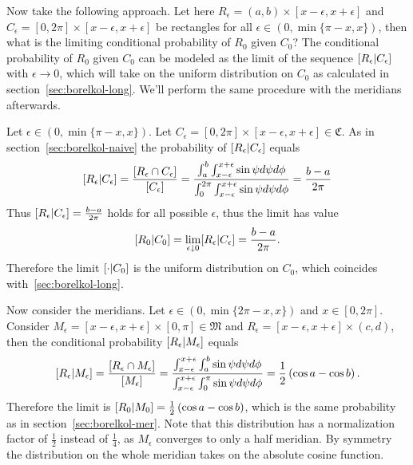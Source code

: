 \documentclass[twoside,a4paper]{article}
\theoremstyle{plain}
\theoremstyle{definition}
\theoremstyle{remark}
\numberwithin{equation}{section}
\let\P\relax
\DeclareMathOperator{\P}{\mathbb{P}}
\DeclareMathOperator{\1}{\mathbbm{1}}
\begin{document}
Now take the following approach. Let here $R_\epsilon=(a,b)\times[x-\epsilon,x+\epsilon]$ and $C_\epsilon=[0,2\pi]\times[x-\epsilon,x+\epsilon]$ be rectangles for all $\epsilon\in(0,\min\{\pi-x,x\})$, then what is the limiting conditional probability of $R_0$ given $C_0$? The conditional probability of $R_0$ given $C_0$ can be modeled as the limit of the sequence $\P[R_\epsilon|C_\epsilon]$ with $\epsilon\to0$, which will take on the uniform distribution on $C_0$ as calculated in section~\ref{sec:borelkol-long}. We'll perform the same procedure with the meridians afterwards.

Let $\epsilon\in(0,\min\{\pi-x,x\})$. Let $C_\epsilon=[0,2\pi]\times[x-\epsilon,x+\epsilon]\in\mathfrak{C}$. As in section~\ref{sec:borelkol-naive} the probability of $\P[R_\epsilon|C_\epsilon]$ equals
\[\P[R_\epsilon|C_\epsilon]=\frac{\P[R_\epsilon\cap C_\epsilon]}{\P[C_\epsilon]}=\frac{\int_{a}^{b}\int_{x-\epsilon}^{x+\epsilon}\sin\psi d\psi d\phi}{\int_{0}^{2\pi}\int_{x-\epsilon}^{x+\epsilon}\sin\psi d\psi d\phi}=\frac{b-a}{2\pi}\]
Thus $\P[R_\epsilon|C_\epsilon]=\frac{b-a}{2\pi}$ holds for all possible $\epsilon$, thus the limit has value \[\P[R_0|C_0]=\lim_{\epsilon\downarrow0}\P[R_\epsilon|C_\epsilon]=\frac{b-a}{2\pi}.\] Therefore the limit $\P[\cdot|C_0]$ is the uniform distribution on $C_0$, which coincides with~\ref{sec:borelkol-long}.

Now consider the meridians. Let $\epsilon\in(0,\min\{2\pi-x,x\})$ and $x\in[0,2\pi]$. Consider $M_\epsilon=[x-\epsilon,x+\epsilon]\times[0,\pi]\in\mathfrak{M}$ and $R_\epsilon=[x-\epsilon,x+\epsilon]\times(c,d)$, then the conditional probability $\P[R_\epsilon|M_\epsilon]$ equals
\[\P[R_\epsilon|M_\epsilon]=\frac{\P[R_\epsilon\cap M_\epsilon]}{\P[M_\epsilon]}=\frac{\int_{x-\epsilon}^{x+\epsilon}\int_a^b\sin\psi d\psi d\phi}{\int_{x-\epsilon}^{x+\epsilon}\int_0^{\pi}\sin\psi d\psi d\phi}=\frac{1}{2}\left(\cos a-\cos b\right).\]
Therefore the limit is $\P[R_0|M_0]=\frac{1}{2}\left(\cos a-\cos b\right)$, which is the same probability as in section~\ref{sec:borelkol-mer}. Note that this distribution has a normalization factor of $\frac{1}{2}$ instead of $\frac{1}{4}$, as $M_\epsilon$ converges to only a half meridian. By symmetry the distribution on the whole meridian takes on the absolute cosine function.
\end{document}
